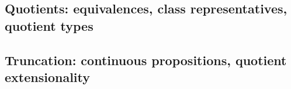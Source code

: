 \subsection{Quotients: equivalences, class representatives, quotient types}\label{sec:equiv-relat-quot}


\subsection{Truncation: continuous propositions, quotient extensionality}\label{sec:trunc-sets-prop}

